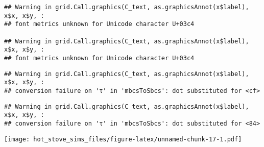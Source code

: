 \documentclass[
]{article}
\begin{document}
\begin{verbatim}
## Warning in grid.Call.graphics(C_text, as.graphicsAnnot(x$label), x$x, x$y, :
## font metrics unknown for Unicode character U+03c4

## Warning in grid.Call.graphics(C_text, as.graphicsAnnot(x$label), x$x, x$y, :
## font metrics unknown for Unicode character U+03c4
\end{verbatim}

\begin{verbatim}
## Warning in grid.Call.graphics(C_text, as.graphicsAnnot(x$label), x$x, x$y, :
## conversion failure on 'τ' in 'mbcsToSbcs': dot substituted for <cf>
\end{verbatim}

\begin{verbatim}
## Warning in grid.Call.graphics(C_text, as.graphicsAnnot(x$label), x$x, x$y, :
## conversion failure on 'τ' in 'mbcsToSbcs': dot substituted for <84>
\end{verbatim}

\texttt{[image: hot\_stove\_sims\_files/figure-latex/unnamed-chunk-17-1.pdf]}
\end{document}
